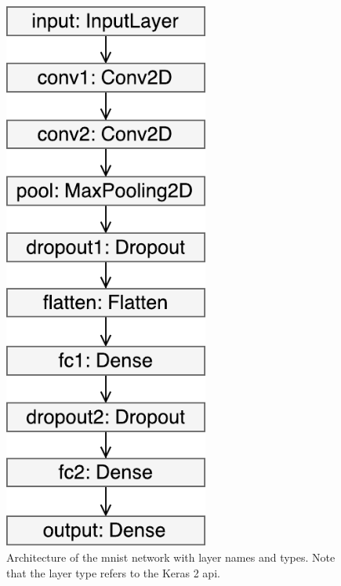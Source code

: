 \begin{figure}
    \begin{minipage}{0.5\textwidth}
        \centering
            \includegraphics[width=0.6\textwidth]{fig/mnist_keras.pdf}
            \caption{Architecture of the \acrshort{mnist} network with layer names and types. Note that the layer type refers to the Keras 2 \acrshort{api}.}
            \label{fig:mnist-architecture}
    \end{minipage}
    \begin{minipage}{0.4\textwidth}
        \centering

\end{minipage}
\end{figure}
